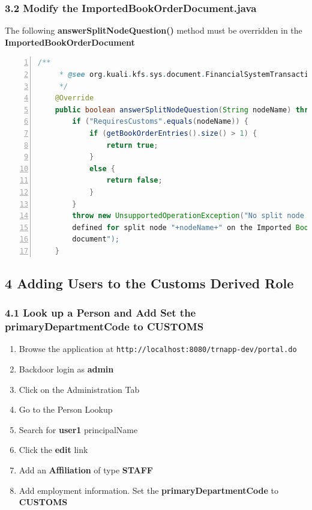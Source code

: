 \subsubsection*{3.2 Modify the ImportedBookOrderDocument.java}
The following \textbf{answerSplitNodeQuestion()} method must be overridden in the \textbf{ImportedBookOrderDocument}
\begin{lstlisting}[numbers=left,language=java,basicstyle=\scriptsize,backgroundcolor=\color{ubergray},caption={New
  KIM Type},frame=single,breaklines=true]
    /**
     * @see org.kuali.kfs.sys.document.FinancialSystemTransactionalDocumentBase#answerSplitNodeQuestion(java.lang.String)
     */
    @Override
    public boolean answerSplitNodeQuestion(String nodeName) throws UnsupportedOperationException {
        if ("RequiresCustoms".equals(nodeName)) {
            if (getBookOrderEntries().size() > 1) {
                return true;
            }
            else {
                return false;
            }
        }
        throw new UnsupportedOperationException("No split node logic
        defined for split node "+nodeName+" on the Imported Book Order
        document");
    }
\end{lstlisting}

\subsection*{4 Adding Users to the Customs Derived Role}
\subsubsection*{4.1 Look up a Person and Add Set the
  primaryDepartmentCode to CUSTOMS}
\begin{enumerate}
  \item Browse the application at
    \verb|http://localhost:8080/trnapp-dev/portal.do|
  \item Backdoor login as \textbf{admin}
  \item Click on the Administration Tab
  \item Go to the Person Lookup 
  \item Search for \textbf{user1} principalName
  \item Click the \textbf{edit} link
  \item Add an \textbf{Affiliation} of type \textbf{STAFF}
  \item Add employment information. Set the
    \textbf{primaryDepartmentCode} to \textbf{CUSTOMS}
\end{enumerate}


